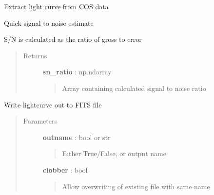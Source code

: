 \documentclass[letterpaper,10pt,english]{sphinxmanual}
\begin{document}
\begin{fulllineitems}
\begin{fulllineitems}
\end{fulllineitems}


\begin{fulllineitems}
\label{index:lightcurve.cos.CosCurve.read_cos}
Extract light curve from COS data

\end{fulllineitems}


\begin{fulllineitems}
\label{index:lightcurve.cos.CosCurve.signal_to_noise}
Quick signal to noise estimate

S/N is calculated as the ratio of gross to error
\begin{quote}\begin{description}
\item[{Returns }] \leavevmode
\textbf{sn\_ratio} : np.ndarray
\begin{quote}

Array containing calculated signal to noise ratio
\end{quote}

\end{description}\end{quote}

\end{fulllineitems}


\begin{fulllineitems}
\label{index:lightcurve.cos.CosCurve.write}
Write lightcurve out to FITS file
\begin{quote}\begin{description}
\item[{Parameters }] \leavevmode
\textbf{outname} : bool or str
\begin{quote}

Either True/False, or output name
\end{quote}

\textbf{clobber} : bool
\begin{quote}

Allow overwriting of existing file with same name
\end{quote}

\end{description}\end{quote}

\end{fulllineitems}


\end{fulllineitems}
\end{document}
